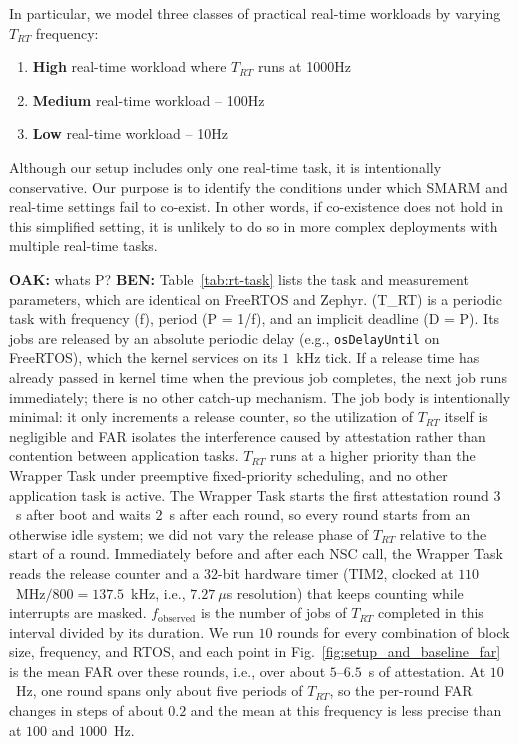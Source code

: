 \documentclass{ieeeaccess}
\DeclareRobustCommand{\oak}[1]{{\color{OAKcolor}\textbf{OAK:} #1}}
\DeclareRobustCommand{\ben}[1]{{\color{BENcolor}\textbf{BEN:} #1}}
\begin{document}
In particular, we model three classes of practical real-time workloads by varying $T_{RT}$ frequency:
\begin{enumerate}
    \item \textbf{High} real-time workload where $T_{RT}$ runs at 1000Hz
    \item \textbf{Medium} real-time workload -- 100Hz
    \item \textbf{Low} real-time workload -- 10Hz
\end{enumerate}

Although our setup includes only one real-time task, it is intentionally conservative.
Our purpose is to identify the conditions under which SMARM and real-time settings fail to co-exist.
In other words, if co-existence does not hold in this simplified setting, it is unlikely to do so in more complex deployments with multiple real-time tasks.

\oak{whats P?}
\ben{Table~\ref{tab:rt-task} lists the task and measurement parameters, which are identical on FreeRTOS and Zephyr.
(T_{RT}) is a periodic task with frequency (f), period (P = 1/f), and an implicit deadline (D = P).
Its jobs are released by an absolute periodic delay (e.g., \texttt{osDelayUntil} on FreeRTOS), which the kernel services on its $1$~kHz tick.
If a release time has already passed in kernel time when the previous job completes, the next job runs immediately; there is no other catch-up mechanism.
The job body is intentionally minimal: it only increments a release counter, so the utilization of $T_{RT}$ itself is negligible and FAR isolates the interference caused by attestation rather than contention between application tasks.
$T_{RT}$ runs at a higher priority than the Wrapper Task under preemptive fixed-priority scheduling, and no other application task is active.
The Wrapper Task starts the first attestation round $3$~s after boot and waits $2$~s after each round, so every round starts from an otherwise idle system; we did not vary the release phase of $T_{RT}$ relative to the start of a round.
Immediately before and after each NSC call, the Wrapper Task reads the release counter and a $32$-bit hardware timer (TIM2, clocked at $110$~MHz$/800 = 137.5$~kHz, i.e., $7.27~\mu$s resolution) that keeps counting while interrupts are masked.
$f_{\text{observed}}$ is the number of jobs of $T_{RT}$ completed in this interval divided by its duration.
We run $10$ rounds for every combination of block size, frequency, and RTOS, and each point in Fig.~\ref{fig:setup_and_baseline_far} is the mean FAR over these rounds, i.e., over about $5$--$6.5$~s of attestation.
At $10$~Hz, one round spans only about five periods of $T_{RT}$, so the per-round FAR changes in steps of about $0.2$ and the mean at this frequency is less precise than at $100$ and $1000$~Hz.}
\end{document}
